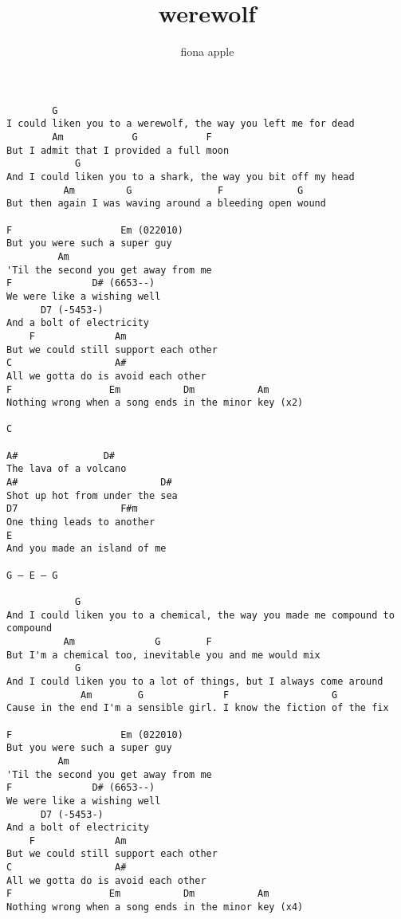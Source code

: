 \author{fiona apple}
\title{werewolf}
\maketitle
\begin{verbatim}
        G
I could liken you to a werewolf, the way you left me for dead
        Am            G            F
But I admit that I provided a full moon
            G
And I could liken you to a shark, the way you bit off my head
          Am         G               F             G
But then again I was waving around a bleeding open wound

F                   Em (022010)
But you were such a super guy
         Am
'Til the second you get away from me
F              D# (6653--)
We were like a wishing well
      D7 (-5453-)
And a bolt of electricity
    F              Am
But we could still support each other
C                  A#
All we gotta do is avoid each other
F                 Em           Dm           Am
Nothing wrong when a song ends in the minor key (x2)

C

A#               D#
The lava of a volcano
A#                         D#
Shot up hot from under the sea
D7                  F#m
One thing leads to another
E
And you made an island of me

G – E – G

            G
And I could liken you to a chemical, the way you made me compound to compound
          Am              G        F
But I'm a chemical too, inevitable you and me would mix
            G
And I could liken you to a lot of things, but I always come around
             Am        G              F                  G
Cause in the end I'm a sensible girl. I know the fiction of the fix

F                   Em (022010)
But you were such a super guy
         Am
'Til the second you get away from me
F              D# (6653--)
We were like a wishing well
      D7 (-5453-)
And a bolt of electricity
    F              Am
But we could still support each other
C                  A#
All we gotta do is avoid each other
F                 Em           Dm           Am
Nothing wrong when a song ends in the minor key (x4)
\end{verbatim}